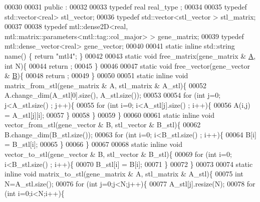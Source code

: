 \begin{DoxyCode}
00030 
00031 public :
00032 
00033   \textcolor{keyword}{typedef} real real\_type ;
00034 
00035   \textcolor{keyword}{typedef} std::vector<real>  stl\_vector;
00036   \textcolor{keyword}{typedef} std::vector<stl\_vector > stl\_matrix;
00037 
00038   \textcolor{keyword}{typedef} mtl::dense2D<real, mtl::matrix::parameters<mtl::tag::col\_major> > gene\_matrix;
00039   \textcolor{keyword}{typedef} mtl::dense\_vector<real>  gene\_vector;
00040 
00041   \textcolor{keyword}{static} \textcolor{keyword}{inline} std::string name() \{ \textcolor{keywordflow}{return} \textcolor{stringliteral}{"mtl4"}; \}
00042 
00043   \textcolor{keyword}{static} \textcolor{keywordtype}{void} free\_matrix(gene\_matrix & \hyperlink{group___core___module_class_eigen_1_1_matrix}{A}, \textcolor{keywordtype}{int} N)\{
00044     return ;
00045   \}
00046 
00047   \textcolor{keyword}{static} \textcolor{keywordtype}{void} free\_vector(gene\_vector & \hyperlink{group___core___module_class_eigen_1_1_matrix}{B})\{
00048     return ;
00049   \}
00050 
00051   \textcolor{keyword}{static} \textcolor{keyword}{inline} \textcolor{keywordtype}{void} matrix\_from\_stl(gene\_matrix & A, stl\_matrix & A\_stl)\{
00052     A.change\_dim(A\_stl[0].size(), A\_stl.size());
00053 
00054     \textcolor{keywordflow}{for} (\textcolor{keywordtype}{int} j=0; j<A\_stl.size() ; j++)\{
00055       \textcolor{keywordflow}{for} (\textcolor{keywordtype}{int} i=0; i<A\_stl[j].size() ; i++)\{
00056         A(i,j) = A\_stl[j][i];
00057       \}
00058     \}
00059   \}
00060 
00061   \textcolor{keyword}{static} \textcolor{keyword}{inline} \textcolor{keywordtype}{void} vector\_from\_stl(gene\_vector & B, stl\_vector & B\_stl)\{
00062     B.change\_dim(B\_stl.size());
00063     \textcolor{keywordflow}{for} (\textcolor{keywordtype}{int} i=0; i<B\_stl.size() ; i++)\{
00064       B[i] = B\_stl[i];
00065     \}
00066   \}
00067 
00068   \textcolor{keyword}{static} \textcolor{keyword}{inline} \textcolor{keywordtype}{void} vector\_to\_stl(gene\_vector & B, stl\_vector & B\_stl)\{
00069     \textcolor{keywordflow}{for} (\textcolor{keywordtype}{int} i=0; i<B\_stl.size() ; i++)\{
00070       B\_stl[i] = B[i];
00071     \}
00072   \}
00073 
00074   \textcolor{keyword}{static} \textcolor{keyword}{inline} \textcolor{keywordtype}{void} matrix\_to\_stl(gene\_matrix & A, stl\_matrix & A\_stl)\{
00075     \textcolor{keywordtype}{int} N=A\_stl.size();
00076     \textcolor{keywordflow}{for} (\textcolor{keywordtype}{int} j=0;j<N;j++)\{
00077       A\_stl[j].resize(N);
00078       \textcolor{keywordflow}{for} (\textcolor{keywordtype}{int} i=0;i<N;i++)\{

\end{DoxyCode}
